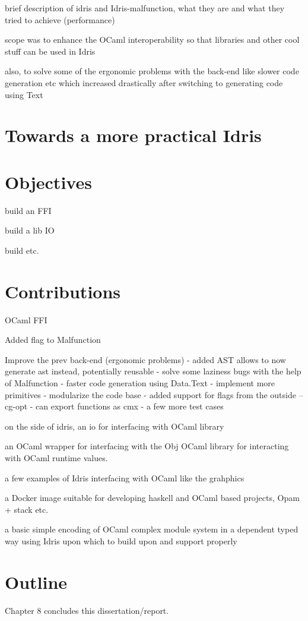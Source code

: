 
brief description of idris and Idris-malfunction, what they are
and what they tried to achieve (performance) 

scope was to enhance the OCaml interoperability so that libraries 
and other cool stuff can be used in Idris 

also, to solve some of the ergonomic problems with the back-end 
like slower code generation etc which increased drastically after 
switching to generating code using Text

\section{Towards a more practical Idris}



\section{Objectives}
build an FFI 

build a lib IO 

build etc.

\section{Contributions}
OCaml FFI 

Added flag to Malfunction

Improve the prev back-end  (ergonomic problems)
	- added AST allows to now generate ast instead, potentially reusable
	- solve some laziness bugs with the help of Malfunction 
	- faster code generation using Data.Text
	- implement more primitives 
	- modularize the code base 
	- added support for flags from the outside --cg-opt
	- can export functions as cmx 
	- a few more test cases

on the side of idris, an io for interfacing with OCaml library

an OCaml wrapper for interfacing with the Obj OCaml library for
interacting with OCaml runtime values. 

a few examples of Idris interfacing with OCaml like the
grahphics

a Docker image suitable for developing haskell and OCaml
based projects, Opam + stack etc.

a basic simple encoding of OCaml complex module system in
a dependent typed way using Idris upon which to build
upon and support properly




\section{Outline}


Chapter 8 concludes this dissertation/report.